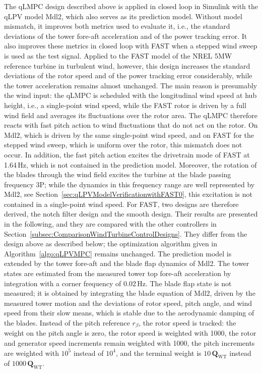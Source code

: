 The qLMPC design described above is applied in closed loop in Simulink with the qLPV model Mdl2, which also serves as its prediction model. Without model mismatch, it improves both metrics used to evaluate it, i.e., the standard deviations of the tower fore-aft acceleration and of the power tracking error. It also improves these metrics in closed loop with FAST when a stepped wind sweep is used as the test signal. Applied to the FAST model of the NREL 5MW reference turbine in turbulent wind, however, this design increases the standard deviations of the rotor speed and of the power tracking error considerably, while the tower acceleration remains almost unchanged. The main reason is presumably the wind input: the qLMPC is scheduled with the longitudinal wind speed at hub height, i.e., a single-point wind speed, while the FAST rotor is driven by a full wind field and averages its fluctuations over the rotor area. The qLMPC therefore reacts with fast pitch action to wind fluctuations that do not act on the rotor. On Mdl2, which is driven by the same single-point wind speed, and on FAST for the stepped wind sweep, which is uniform over the rotor, this mismatch does not occur. In addition, the fast pitch action excites the drivetrain mode of FAST at 1.64\,Hz, which is not contained in the prediction model. Moreover, the rotation of the blades through the wind field excites the turbine at the blade passing frequency 3P; while the dynamics in this frequency range are well represented by Mdl2, see Section~\ref{sec:qLPVModelVerificationwithFAST0}, this excitation is not contained in a single-point wind speed. For FAST, two designs are therefore derived, the notch filter design and the smooth design. Their results are presented in the following, and they are compared with the other controllers in Section~\ref{subsec:ComparisonWindTurbineControlDesigns}. They differ from the design above as described below; the optimization algorithm given in Algorithm~\ref{algo:qLPVMPC} remains unchanged.
The prediction model is extended by the tower fore-aft and the blade flap dynamics of Mdl2. The tower states are estimated from the measured tower top fore-aft acceleration by integration with a corner frequency of 0.02\,Hz. The blade flap state is not measured; it is obtained by integrating the blade equation of Mdl2, driven by the measured tower motion and the deviations of rotor speed, pitch angle, and wind speed from their slow means, which is stable due to the aerodynamic damping of the blades. Instead of the pitch reference $r_\beta$, the rotor speed is tracked: the weight on the pitch angle is zero, the rotor speed is weighted with 1000, the rotor and generator speed increments remain weighted with 1000, the pitch increments are weighted with $10^5$ instead of $10^4$, and the terminal weight is $10\,\bm{Q}_{\text{WT}}$ instead of $1000\,\bm{Q}_{\text{WT}}$.
